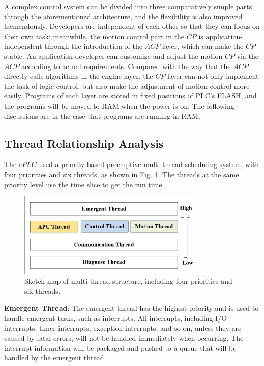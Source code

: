 \documentclass[journal]{IEEEtran}
\begin{document}
A complex control system can be divided into three comparatively simple parts through the aforementioned architecture, and the flexibility is also improved tremendously. Developers are independent of each other so that they can focus on their own task; meanwhile, the motion control part in the $CP$ is application-independent through the introduction of the $ACP$ layer, which can make the $CP$ stable. An application developer can customize and adjust the motion $CP$ via the $ACP$ according to  actual requirements. Compared with the way that the $ACP$ directly calls algorithms in the engine layer, the $CP$ layer can not only implement the task of logic control, but also make the adjustment of motion control more easily. Programs of each layer are stored in fixed positions of PLC's FLASH, and the programs will be moved to RAM when the power is on. The following discussions are in the case that programs are running in RAM.

\subsection{Thread Relationship Analysis}
The $ePLC$ used a priority-based preemptive multi-thread scheduling system, with four priorities and six threads, as shown in Fig. \ref{fig:multithreadstructure}. The threads at the same priority level use the time slice to get the run time.


\begin{figure}
\centering
\includegraphics[width=3.5in]{fig/FIG5_TII-18-0024.eps}
\caption{Sketch map of multi-thread structure, including four priorities and six threads.}
\label{fig:multithreadstructure}
\end{figure}



\textbf{Emergent Thread}: The emergent thread has the highest priority and is used to handle emergent tasks, such as interrupts. All interrupts, including I/O interrupts, timer interrupts, exception interrupts, and so on, unless they are caused by fatal errors, will not be handled immediately when occurring. The interrupt information will be packaged and pushed to a queue that will be handled by the emergent thread.
\end{document}
